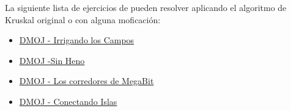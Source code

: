 La siguiente lista de ejercicios de pueden resolver aplicando el algoritmo de Kruskal original o con alguna moficación:

\begin{itemize}
   \item \href{https://dmoj.uclv.edu.cu/problem/irrigation} {DMOJ - Irrigando los Campos}
   \item \href{https://dmoj.uclv.edu.cu/problem/outofhay}{DMOJ -Sin Heno}
   \item \href{https://dmoj.uclv.edu.cu/problem/megabit}{DMOJ - Los corredores de MegaBit} 
   \item \href{https://dmoj.uclv.edu.cu/problem/iconnect }{DMOJ - Conectando Islas}
\end{itemize}